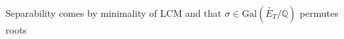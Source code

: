 \documentclass[preview]{standalone}
\begin{document}
\begin{center}
Separability comes by minimality of LCM and that $\sigma \in \text{Gal}\left(\widetilde{E_T}/\mathbb{Q}\right)$ permutes roots
\end{center}
\end{document}
